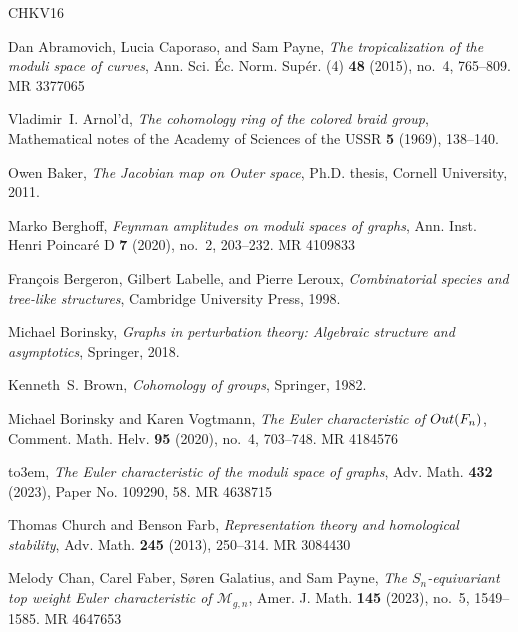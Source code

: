 \documentclass[oneside]{amsart}
\theoremstyle{remark}
\begin{document}
\newcommand{\etalchar}[1]{$^{#1}$}
\providecommand{\bysame}{\leavevmode\hbox to3em{\hrulefill}\thinspace}
\providecommand{\MR}{\relax\ifhmode\unskip\space\fi MR }
%
\providecommand{\MRhref}[2]{%
  \href{http://www.ams.org/mathscinet-getitem?mr=#1}{#2}
}
\providecommand{\href}[2]{#2}
\begin{thebibliography}{CHKV16}

Dan Abramovich, Lucia Caporaso, and Sam Payne, \emph{The tropicalization of the
  moduli space of curves}, Ann. Sci. \'Ec. Norm. Sup\'er. (4) \textbf{48}
  (2015), no.~4, 765--809. \MR{3377065}

Vladimir~I. Arnol'd, \emph{The cohomology ring of the colored braid group},
  Mathematical notes of the Academy of Sciences of the USSR \textbf{5} (1969),
  138--140.

Owen Baker, \emph{{The Jacobian map on Outer space}}, Ph.D. thesis, Cornell
  University, 2011.

Marko Berghoff, \emph{Feynman amplitudes on moduli spaces of graphs}, Ann.
  Inst. Henri Poincar\'e{} D \textbf{7} (2020), no.~2, 203--232. \MR{4109833}

Fran{\c{c}}ois Bergeron, Gilbert Labelle, and Pierre Leroux,
  \emph{Combinatorial species and tree-like structures}, Cambridge University
  Press, 1998.

Michael Borinsky, \emph{{Graphs in perturbation theory: Algebraic structure and
  asymptotics}}, Springer, 2018.

Kenneth~S. Brown, \emph{Cohomology of groups}, Springer, 1982.

Michael Borinsky and Karen Vogtmann, \emph{The {E}uler characteristic of {${\rm Out}(F_n)$}}, Comment. Math. Helv. \textbf{95} (2020), no.~4, 703--748.
  \MR{4184576}

\bysame, \emph{The {E}uler characteristic of the moduli space of graphs}, Adv.
  Math. \textbf{432} (2023), Paper No. 109290, 58. \MR{4638715}

Thomas Church and Benson Farb, \emph{Representation theory and homological
  stability}, Adv. Math. \textbf{245} (2013), 250--314. \MR{3084430}

Melody Chan, Carel Faber, S{\o}ren Galatius, and Sam Payne, \emph{The
  {$S_n$}-equivariant top weight {E}uler characteristic of {$\mathcal M_{g,n}$}}, Amer. J. Math. \textbf{145} (2023), no.~5, 1549--1585.
  \MR{4647653}


\end{thebibliography}
\end{document}
